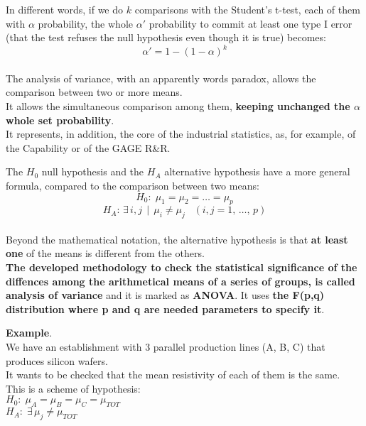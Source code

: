\begin{frame}
  \vspace*{.25cm}
  In different words, if we do $ k $ comparisons with the Student's t-test, each of them with $ \alpha $ probability, the whole $ \alpha' $ probability to commit at least one type I error (that the test refuses the null hypothesis even though it is true) becomes:
  $$ \alpha' = 1 - (1 - \alpha)^k $$\\
  \vspace*{.25cm}
  The analysis of variance, with an apparently words paradox, allows the comparison between two or more means.\\
  It allows the simultaneous comparison among them, \textbf{keeping unchanged the {\boldmath $ \alpha $} whole set probability}.\\
  \vspace*{.25cm}
  It represents, in addition, the core of the industrial statistics, as, for example, of the Capability or of the GAGE R\&R.
\end{frame}

\begin{frame}
  \vspace*{.25cm}
  The $ H_0 $ null hypothesis and the $ H_A $ alternative hypothesis have a more general formula, compared to the comparison between two means: \\
  \vspace*{.15cm}
  {\boldmath $$ H_0: \; \mu_1= \mu_2 = \dots = \mu_p $$}
  {\boldmath $$ H_A: \, \exists \, i,j \,\mid\,\mu_i\neq\mu_j\;\;\;(i,j=1,\,\dots,\,p)$$}\\
  \vspace*{.15cm} 
  Beyond the mathematical notation, the alternative hypothesis is that \textbf{at least one} of the means is different from the others.\\
  \textbf{The developed methodology to check the statistical significance of the diffences among the arithmetical means of a series of groups, is called analysis of variance} and it is marked as \textbf{ANOVA}. It uses \textbf{the F(p,q) distribution where p and q are needed parameters to specify it}.
\end{frame}

\begin{frame}
  \vspace*{.25cm}
  \textbf{Example}. \\
  \vspace*{.15cm}
  We have an establishment with 3 parallel production lines (A, B, C) that produces silicon wafers.\\
  It wants to be checked that the mean resistivity of each of them is the same.\\
  \vspace*{.75cm}
  This is a scheme of hypothesis:\\
  \hspace*{2cm}$H_0:\;\mu_A=\mu_B=\mu_C=\mu_{TOT}$\\
  \vspace*{.15cm}
  \hspace*{2cm}$H_A:\;\exists\,\mu_j \ne \mu_{TOT}$
\end{frame}


